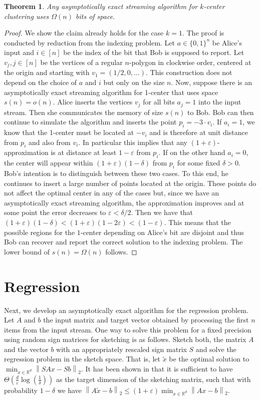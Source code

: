 \documentclass[a4paper,11pt,oneside,english,onecolumn]{article}
\newtheorem{theorem}{Theorem}
\theoremstyle{definition}
\newcommand{\norm}[1]{\ensuremath{\left\| #1\right\|_2}}
\newcommand{\REAL}{\ensuremath{\mathbb{R}}}
\newcommand{\eps}{\ensuremath{\varepsilon}}
\begin{document}
\begin{theorem}
\label{lower:kcenter}
Any asymptotically exact streaming algorithm for $k$-center clustering uses $\Omega(n)$ bits of space.
\end{theorem}
\begin{proof}
We show the claim already holds for the case $k=1$. 
The proof is conducted by reduction from the indexing problem. Let $a\in \{0,1\}^n$ be Alice's input and $i\in [n]$ be the index of the bit that Bob is supposed to report. Let $v_j, j\in [n]$ be the vertices of a regular $n$-polygon in clockwise order, centered at the origin and starting with $v_1=(1/2,0,\ldots)$. This construction does not depend on the choice of $a$ and $i$ but only on the size $n$. Now, suppose there is an asymptotically exact streaming algorithm for 1-center that uses space $s(n)=o(n)$. Alice inserts the vertices $v_j$ for all bits $a_j=1$ into the input stream. Then she communicates the memory of size $s(n)$ to Bob. Bob can then continue to simulate the algorithm and inserts the point $p_i=-3 \cdot v_i$. If $a_i=1$, we know that the 1-center must be located at $-v_i$ and is therefore at unit distance from $p_i$ and also from $v_i$. In particular this implies that any $(1+\varepsilon)$-approximation is at distance at least $1-\varepsilon$ from $p_i$. If on the other hand $a_i=0$, the center will appear within $(1+\varepsilon)(1-\delta)$ from $p_i$ for some fixed $\delta>0$. Bob's intention is to distinguish between these two cases. To this end, he 
 continues to insert a large number of points located at the origin. These points do not affect the optimal center in any of the cases but, since we have an asymptotically exact streaming algorithm, the approximation improves and at some point the error decreases to $\varepsilon < \delta/2$. Then we have that $(1+\varepsilon) (1-\delta) < (1+\varepsilon) (1-2\varepsilon) < (1-\varepsilon).$ This means that the possible regions for the $1$-center depending on Alice's bit are disjoint and thus Bob can recover and report the correct solution to the indexing problem. The lower bound of $s(n)=\Omega(n)$ follows.
\end{proof}

\section{Regression}
\label{section:Regression}

Next, we develop an asymptotically exact algorithm for the regression problem. Let $A$ and $b$ the input matrix and target vector obtained by processing the first $n$ items from the input stream. One way to solve this problem for a fixed precision using random sign matrices for sketching is as follows. Sketch both, the matrix $A$ and the vector $b$ with an appropriately rescaled sign matrix $S$ and solve the regression problem in the sketch space. That is, let $\tilde x$ be the optimal solution to $\min_{x \in \REAL ^d} \norm{SAx - Sb}$. It has been shown in \cite{LinAlgStream} that it is sufficient to have $\Theta(\frac{d}{\eps}\log(\frac{1}{\delta}))$ as the target dimension of the sketching matrix, such that with probability $1-\delta$ we have $\norm{A\tilde x - b} \leq (1 + \eps) \min_{x \in \REAL ^d}\norm{A x -b}$.
\end{document}

